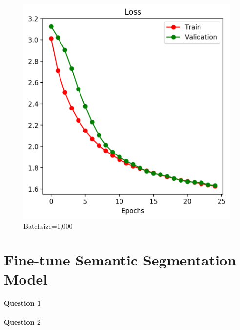 \documentclass[12pt]{article}
\begin{document}
	\begin{figure}[H]
		\centering
		\caption{Batchsize=1,000}
		\includegraphics[width=0.55\linewidth]{figures/unet_learning_bs_1000.png}
	\end{figure}
	
	\section{Fine-tune Semantic Segmentation Model}
	\paragraph{Question 1} 
	\paragraph{Question 2}
\end{document}
